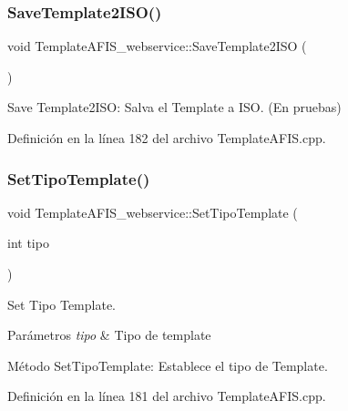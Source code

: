 \subsubsection{\texorpdfstring{Save\+Template2\+I\+S\+O()}{SaveTemplate2ISO()}}
{\footnotesize\ttfamily void Template\+A\+F\+I\+S\+\_\+webservice\+::\+Save\+Template2\+I\+SO (\begin{DoxyParamCaption}{ }\end{DoxyParamCaption})}



Save Template2\+I\+SO\+: Salva el Template a I\+SO. (En pruebas) 



Definición en la línea 182 del archivo Template\+A\+F\+I\+S.\+cpp.

\hypertarget{classTemplateAFIS__webservice_a6357de3d3323010cb5890d2f583e0f94}{}\label{classTemplateAFIS__webservice_a6357de3d3323010cb5890d2f583e0f94} 
\subsubsection{\texorpdfstring{Set\+Tipo\+Template()}{SetTipoTemplate()}}
{\footnotesize\ttfamily void Template\+A\+F\+I\+S\+\_\+webservice\+::\+Set\+Tipo\+Template (\begin{DoxyParamCaption}\item[{int}]{tipo }\end{DoxyParamCaption})}



Set Tipo Template. 


\begin{DoxyParams}{Parámetros}
{\em tipo} & Tipo de template\\
\hline
\end{DoxyParams}
Método Set\+Tipo\+Template\+: Establece el tipo de Template. 

Definición en la línea 181 del archivo Template\+A\+F\+I\+S.\+cpp.

\hypertarget{classTemplateAFIS__webservice_a90522f2c2f10ae8fa3ab6abd0273b714}{}\label{classTemplateAFIS__webservice_a90522f2c2f10ae8fa3ab6abd0273b714} 
